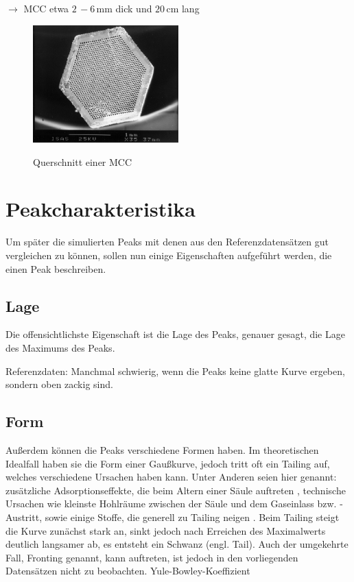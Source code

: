 $\rightarrow$ MCC etwa $2\,-6$\,mm dick und $20$\,cm lang

\begin{figure}
 \centering
  \includegraphics[width = 0.5\textwidth]{bilder/MultiCapillaryColumn}\\
  \caption[Querschnitt einer MCC]{Querschnitt einer MCC \protect\footnotemark}
\end{figure}

\section{Peakcharakteristika}
Um später die simulierten Peaks mit denen aus den Referenzdatensätzen gut vergleichen zu können, sollen nun einige Eigenschaften aufgeführt werden, die einen Peak beschreiben.

\subsection{Lage}
Die offensichtlichste Eigenschaft ist die Lage des Peaks, genauer gesagt, die Lage des Maximums des Peaks. 

Referenzdaten: Manchmal schwierig, wenn die Peaks keine glatte Kurve ergeben, sondern oben zackig sind. 

\subsection{Form}
Außerdem können die Peaks verschiedene Formen haben. Im theoretischen Idealfall haben sie die Form einer Gaußkurve, jedoch tritt oft ein Tailing auf, welches verschiedene Ursachen haben kann. Unter Anderen seien hier genannt: zusätzliche Adsorptionseffekte, die beim Altern einer Säule auftreten \cite{kolb2003}, technische Ursachen wie kleinste Hohlräume zwischen der Säule und dem Gaseinlass bzw. -Austritt, sowie einige Stoffe, die generell zu Tailing neigen . 
Beim Tailing steigt die Kurve zunächst stark an, sinkt jedoch nach Erreichen des Maximalwerts deutlich langsamer ab, es entsteht ein Schwanz (engl. Tail). Auch der umgekehrte Fall, Fronting genannt, kann auftreten, ist jedoch in den vorliegenden Datensätzen nicht zu beobachten.
Yule-Bowley-Koeffizient

